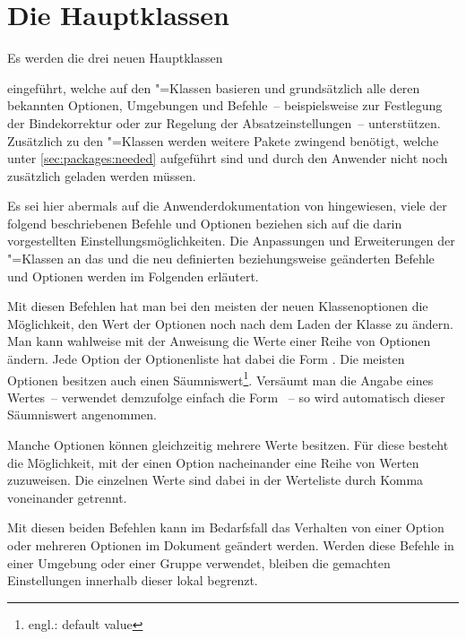 \chapter[Die Klassen tudscrbook, tudscrreprt und tudscrartcl]{Die Hauptklassen}
Es werden die drei neuen Hauptklassen
%
\begin{description}
\item {}
\item {}
\item {}
\end{description}
%
eingeführt, welche auf den \KOMAScript"=Klassen basieren und grundsätzlich alle
deren bekannten Optionen, Umgebungen und Befehle~-- beispielsweise
 zur Festlegung der Bindekorrektur oder  zur 
Regelung der Absatzeinstellungen~-- unterstützen. Zusätzlich zu den 
\KOMAScript"=Klassen werden weitere Pakete zwingend benötigt, welche unter 
\autoref{sec:packages:needed} aufgeführt sind und durch den Anwender nicht noch 
zusätzlich geladen werden müssen.

Es sei hier abermals auf die Anwenderdokumentation \scrguide von \KOMAScript{} 
hingewiesen, viele der folgend beschriebenen Befehle und Optionen beziehen sich 
auf die darin vorgestellten Einstellungsmöglichkeiten. Die Anpassungen und 
Erweiterungen der \KOMAScript"=Klassen an das \CD und die neu definierten 
beziehungsweise geänderten Befehle und Optionen werden im Folgenden erläutert.

\begin{Declaration}{}
\begin{Declaration}{}
\printdeclarationlist%
%
%
Mit diesen Befehlen hat man bei den meisten der neuen Klassenoptionen die 
Möglichkeit, den Wert der Optionen noch nach dem Laden der Klasse zu ändern.
Man kann wahlweise mit der Anweisung  die Werte einer Reihe 
von Optionen ändern. Jede Option der Optionenliste hat dabei die Form
\PValue{=}. Die meisten Optionen besitzen auch einen 
Säumniswert\footnote{engl.: default value}. Versäumt man die Angabe eines 
Wertes~-- verwendet demzufolge einfach die Form ~-- so wird 
automatisch dieser Säumniswert angenommen.

Manche Optionen können gleichzeitig mehrere Werte besitzen. Für diese besteht 
die Möglichkeit, mit  der einen Option nacheinander eine 
Reihe von Werten zuzuweisen. Die einzelnen Werte sind dabei in der Werteliste 
durch Komma voneinander getrennt.

Mit diesen beiden Befehlen kann im Bedarfsfall das Verhalten von einer Option 
oder mehreren Optionen im Dokument geändert werden. Werden diese Befehle in 
einer Umgebung oder einer Gruppe verwendet, bleiben die gemachten Einstellungen 
innerhalb dieser lokal begrenzt.
\end{Declaration}
\end{Declaration}


